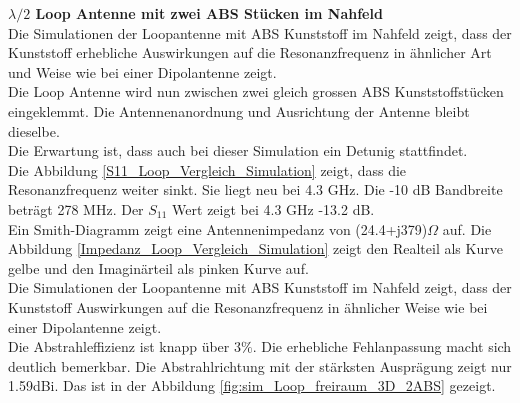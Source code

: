 \textbf{$\lambda/2$ Loop Antenne mit zwei ABS Stücken im Nahfeld}\\
Die Simulationen der Loopantenne mit ABS Kunststoff im Nahfeld zeigt, dass der Kunststoff erhebliche Auswirkungen auf die Resonanzfrequenz in ähnlicher Art und Weise wie bei einer Dipolantenne zeigt.\\

Die Loop Antenne wird nun zwischen zwei gleich grossen ABS Kunststoffstücken eingeklemmt. Die Antennenanordnung und Ausrichtung der Antenne bleibt dieselbe. \\
Die Erwartung ist, dass auch bei dieser Simulation ein Detunig stattfindet.\\ 

Die Abbildung \ref{S11_Loop_Vergleich_Simulation} zeigt, dass die Resonanzfrequenz weiter sinkt. Sie liegt neu bei 4.3 GHz. Die -10 dB Bandbreite beträgt 278 MHz. Der $S_{11}$ Wert zeigt bei 4.3 GHz -13.2 dB.\\
Ein Smith-Diagramm zeigt eine Antennenimpedanz von (24.4+j379)$\Omega$ auf. Die Abbildung \ref{Impedanz_Loop_Vergleich_Simulation} zeigt den Realteil als Kurve gelbe und den Imaginärteil als pinken Kurve auf. \\
Die Simulationen der Loopantenne mit ABS Kunststoff im Nahfeld zeigt, dass der Kunststoff Auswirkungen auf die Resonanzfrequenz in ähnlicher Weise wie bei einer Dipolantenne zeigt.\\
Die Abstrahleffizienz ist knapp über $3\%$. Die erhebliche Fehlanpassung macht sich deutlich bemerkbar. Die Abstrahlrichtung mit der stärksten Ausprägung zeigt nur 1.59dBi. Das ist in der Abbildung \ref{fig:sim_Loop_freiraum_3D_2ABS} gezeigt.
